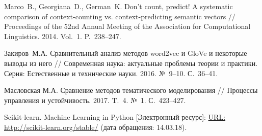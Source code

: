 \documentclass[12pt]{article}
\newcounter{c_tab}
\begin{document}
\begin{thebibliography}{99}
   Marco~B., Georgiana~D., German~K. Don’t count, predict! A systematic comparison of context-counting vs. context-predicting semantic vectors //  Proceedings of the 52nd Annual Meeting of the Association for Computational Linguistics. 2014. Vol.~1. P.~238--247.

  Закиров~М.\:А. Сравнительный анализ методов word2vec и GloVe и некоторые выводы из него // Современная наука: актуальные проблемы теории и практики. Серия: Естественные и технические науки. 2016. №~9--10. С.~36--41.

 Масловская М.\:А. Сравнение методов тематического моделирования // Процессы управления и устойчивость. 2017. T.~4. №~1. С.~423--427.

  Scikit-learn. Machine Learning in Python [Электронный ресурс]: \url{URL: http://scikit-learn.org/stable/} (дата обращения: 14.03.18).

\end{thebibliography}
\end{document}
